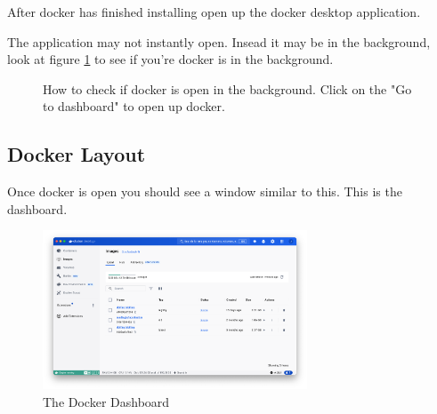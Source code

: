 \documentclass[final]{article}
\numberwithin{equation}{section}
\theoremstyle{remarkStyle}
\begin{document}
After docker has finished installing open up the docker desktop application.

The application may not instantly open. Insead it may be in the background, look at figure \ref{fig:open_docker} to see if you're docker is in the background.
\begin{figure}[H]
  \centering
  \qquad
  \caption{How to check if docker is open in the background. Click on the "Go to dashboard" to open up docker.}%
  \label{fig:open_docker}%
\end{figure}

\subsection{Docker Layout}
Once docker is open you should see a window similar to this. This is the dashboard.


\begin{figure}[H]
  \centering
  \includegraphics[width=0.7\textwidth]{DockerHomePage.png}
  \caption{ The Docker Dashboard}%
  \label{fig:docker_home}%
\end{figure}
\end{document}
